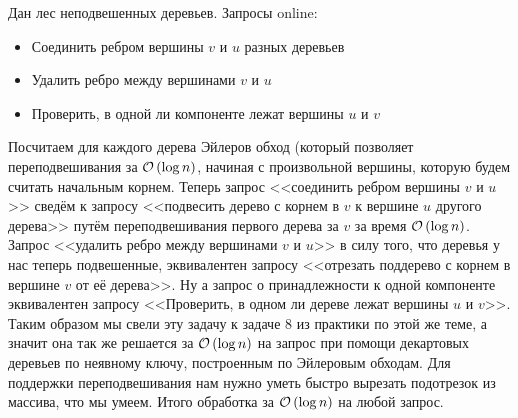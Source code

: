\begin{task}[4]
Дан лес неподвешенных деревьев. Запросы online:
\begin{itemize}
	\item Соединить ребром вершины $v$ и $u$ разных деревьев
	\item Удалить ребро между вершинами $v$ и $u$
	\item Проверить, в одной ли компоненте лежат вершины $u$ и $v$
\end{itemize}
\end{task}
\begin{solution}
Посчитаем для каждого дерева Эйлеров обход (который позволяет переподвешивания за $\mathcal{O}\left(\log{n}\right)$, начиная с произвольной вершины, которую будем считать начальным корнем.
Теперь запрос <<соединить ребром вершины $v$ и $u$>> сведём к запросу <<подвесить дерево с корнем в $v$ к вершине $u$ другого дерева>> путём переподвешивания первого дерева за $v$ за время $\mathcal{O}\left(\log{n}\right)$. Запрос <<удалить ребро между вершинами $v$ и $u$>> в силу того, что деревья у нас теперь подвешенные, эквивалентен запросу <<отрезать поддерево с корнем в вершине $v$ от её дерева>>. Ну а запрос о принадлежности к одной компоненте эквивалентен запросу <<Проверить, в одном ли дереве лежат вершины $u$ и $v$>>. Таким образом мы свели эту задачу к задаче $8$ из практики по этой же теме, а значит она так же решается за $\mathcal{O}\left(\log{n}\right)$ на запрос при помощи декартовых деревьев по неявному ключу, построенным по Эйлеровым обходам. Для поддержки переподвешивания нам нужно уметь быстро вырезать подотрезок из массива, что мы умеем. Итого обработка за $\mathcal{O}\left(\log{n}\right)$ на любой запрос. \xqed
\end{solution}


